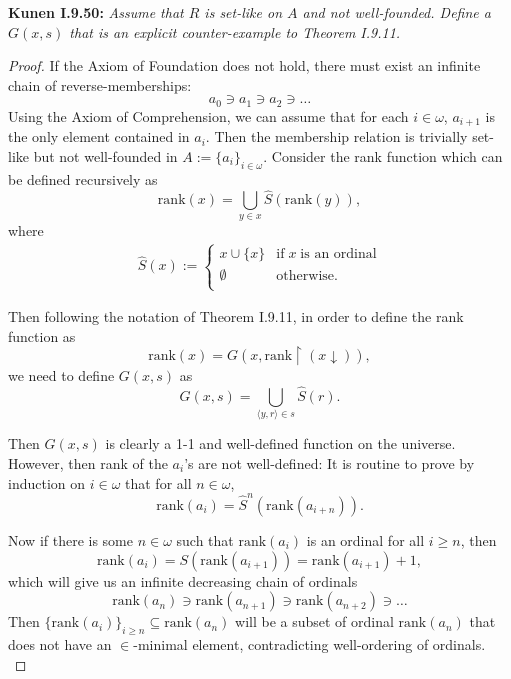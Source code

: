 \documentclass{article}
\begin{document}
\textbf{Kunen I.9.50:} \it Assume that $R$ is set-like on $A$ and not
  well-founded. Define a $G(x,s)$ that is an explicit counter-example to
  Theorem I.9.11.

  \begin{proof}
    If the Axiom of Foundation does not hold, there must exist an infinite
    chain of reverse-memberships:
    \[a_0 \ni a_1 \ni a_2 \ni \ldots\]
    Using the Axiom of Comprehension, we can assume that for each
    $i\in\omega$, $a_{i+1}$ is the only element contained in $a_i$. Then
    the membership relation is trivially set-like but not well-founded in
    $A:=\{a_i\}_{i\in\omega}$. Consider the rank function which can be
    defined recursively as
    \[\text{rank}(x) =\bigcup_{y\in x} \hat{S}(\text{rank}(y)),\]
    where
    \begin{align*}
      \hat{S}(x) :=
      \begin{cases}
        x\cup\{x\} &\text{if}\; x\; \text{is an ordinal}\\
        \emptyset &\text{otherwise}.\\
      \end{cases}
    \end{align*}

    Then following the notation of Theorem I.9.11, in order to define the
    rank function as
    \[\text{rank}(x)=G(x,\text{rank}\restriction(x\downarrow)),\]
    we need to define $G(x,s)$ as
    \[G(x,s) =\bigcup_{\langle y,r\rangle\in s} \hat{S}(r).\]

    Then $G(x,s)$ is clearly a 1-1 and well-defined function on the
    universe. However, then rank of the $a_i$'s are not well-defined: It is
    routine to prove by induction on $i\in\omega$ that for all
    $n\in\omega$,
    \[\text{rank}(a_i) =\hat{S}^n(\text{rank}(a_{i+n})).\]

    Now if there is some $n\in\omega$ such that $\text{rank}(a_i)$ is an
    ordinal for all $i\geq n$, then
    \[\text{rank}(a_i) =S(\text{rank}(a_{i+1})) =\text{rank}(a_{i+1})+1,\]
    which will give us an infinite decreasing chain of ordinals
    \[\text{rank}(a_n) \ni\text{rank}(a_{n+1}) \ni\text{rank}(a_{n+2})
    \ni\ldots\]
    Then $\{\text{rank}(a_i)\}_{i\geq n} \subseteq\text{rank}(a_n)$ will
    be a subset of ordinal $\text{rank}(a_n)$ that does not have an
    $\in$-minimal element, contradicting well-ordering of ordinals. \\


\end{proof}
\end{document}
